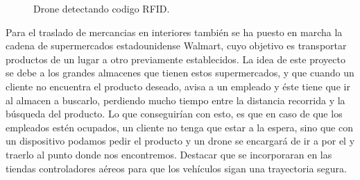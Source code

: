 \begin{figure}[H]
 \centering
 \caption{Drone detectando codigo RFID.}
 \label{f:Drone detecta codigo RFID}
\end{figure} 


\hspace{1 cm} Para el traslado de mercancias en interiores tambi\'en se ha puesto en marcha la cadena de supermercados estadounidense Walmart, cuyo objetivo es transportar productos de un lugar a otro previamente establecidos. La idea de este proyecto se debe a los grandes almacenes que tienen estos supermercados, y que cuando un cliente no encuentra el producto deseado, avisa a un empleado y \'este tiene que ir al almacen a buscarlo, perdiendo mucho tiempo entre la distancia recorrida y la b\'usqueda del producto. Lo que conseguir\'ian con esto, es que en caso de que los empleados est\'en ocupados, un cliente no tenga que estar a la espera, sino que con un dispositivo podamos pedir el producto y un drone se encargar\'a de ir a por el y traerlo al punto donde nos encontremos. Destacar que se incorporaran en las tiendas controladores a\'ereos para que los veh\'iculos sigan una trayectoria segura.  




